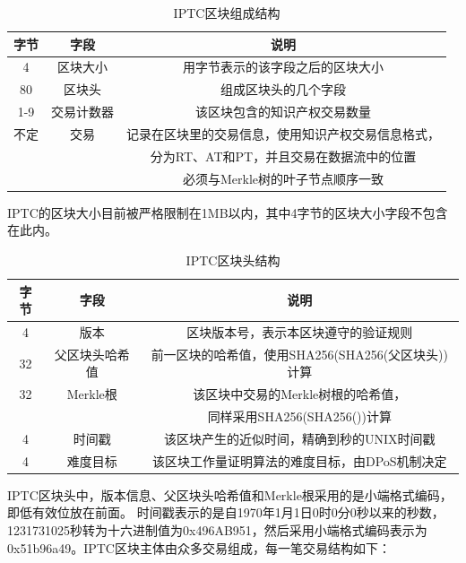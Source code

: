 \documentclass[withoutpreface,bwprint]{cumcmthesis} %
\begin{document}
\begin{table}[h]
	\caption{IPTC区块组成结构}\label{tab001} \centering
	\begin{tabular}{ccc}
		\toprule[1.5pt]
		字节 & 字段 & 说明 \\
		\midrule[1pt]
		4 & 区块大小 & 用字节表示的该字段之后的区块大小\\
		80 & 区块头 & 组成区块头的几个字段\\
		1-9 & 交易计数器 & 该区块包含的知识产权交易数量\\
		不定 & 交易 & 记录在区块里的交易信息，使用知识产权交易信息格式，\\
		& & 分为RT、AT和PT，并且交易在数据流中的位置\\
		& & 必须与Merkle树的叶子节点顺序一致\\
		\bottomrule[1.5pt]
	\end{tabular}
\end{table}
IPTC的区块大小目前被严格限制在1MB以内，其中4字节的区块大小字段不包含在此内。

\newpage

\begin{table}[h]
	\caption{IPTC区块头结构}\label{tab001} \centering
	\begin{tabular}{ccc}
		\toprule[1.5pt]
		字节 & 字段 & 说明 \\
		\midrule[1pt]
		4 & 版本 & 区块版本号，表示本区块遵守的验证规则\\
		32 & 父区块头哈希值 & 前一区块的哈希值，使用SHA256(SHA256(父区块头))计算\\
		32 & Merkle根 & 该区块中交易的Merkle树根的哈希值，\\
		& & 同样采用SHA256(SHA256())计算\\
		4 & 时间戳 & 该区块产生的近似时间，精确到秒的UNIX时间戳\\
		4 & 难度目标 & 该区块工作量证明算法的难度目标，由DPoS机制决定\\
		\bottomrule[1.5pt]
	\end{tabular}
\end{table}
IPTC区块头中，版本信息、父区块头哈希值和Merkle根采用的是小端格式编码，即低有效位放在前面。
时间戳表示的是自1970年1月1日0时0分0秒以来的秒数，1231731025秒转为十六进制值为0x496AB951，然后采用小端格式编码表示为0x51b96a49。IPTC区块主体由众多交易组成，每一笔交易结构如下：
\end{document}
